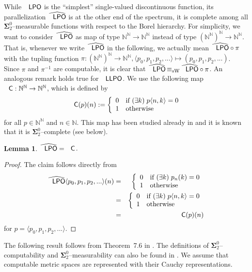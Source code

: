 \documentclass[jsl,10pt]{noasl}
\def\IN{{\mathbb{N}}}
\newcommand{\SO}[1]{{{\boldsymbol\Sigma}^0_{#1}}}
\def\LPO{\text{\rm\sffamily LPO}}
\def\LLPO{\text{\rm\sffamily LLPO}}
\def\C{\text{\rm\sffamily C}}
\def\LPO{\text{\rm\sffamily LPO}}
\def\LLPO{\text{\rm\sffamily LLPO}}
\def\equivSW{\mathop{\equiv_{\mathrm{sW}}}}
\newtheorem{lemma}[proposition]{Lemma}
\begin{document}
While $\LPO$ is the ``simplest'' single-valued discontinuous function, 
its parallelization $\widehat{\LPO}$ is at the other end of the spectrum,
it is complete among all $\SO{2}$--measurable functions with respect to the
Borel hierarchy. 
For simplicity, we want to consider $\widehat{\LPO}$ as map of type $\IN^\IN\to\IN^\IN$
instead of type $(\IN^\IN)^\IN\to\IN^\IN$. That is, whenever we write $\widehat{\LPO}$
in the following, we actually mean $\widehat{\LPO}\circ\pi$ with
the tupling function $\pi:(\IN^\IN)^\IN\to\IN^\IN,\langle p_0,p_1,p_2,...\rangle\mapsto(p_0,p_1,p_2,...)$.
Since $\pi$ and $\pi^{-1}$ are computable, it is clear that $\widehat{\LPO}\equivSW\widehat{\LPO}\circ\pi$.
An analogous remark holds true for $\LLPO$.
We use the following map $\C:\IN^\IN\to\IN^\IN$, which is defined by
\[\C(p)(n):=\left\{\begin{array}{ll}
  0 & \mbox{if $(\exists k)\;p\langle n,k\rangle=0$}\\
  1 & \mbox{otherwise}
\end{array}\right.
\]
for all $p\in\IN^\IN$ and $n\in\IN$. This map has been studied already in \cite{Ste89,Myl92,Bra99,Bra05}
and it is known that it is $\SO{2}$--complete (see below).

\begin{lemma}
\label{lem:LPO-C}
$\widehat{\LPO}=\C$.
\end{lemma}
\begin{proof}
The claim follows directly from
\begin{eqnarray*}
\widehat{\LPO}\langle p_0,p_1,p_2,...\rangle(n)
&=& \left\{\begin{array}{ll}
     0 & \mbox{if $(\exists k)\;p_n(k)=0$}\\
     1 & \mbox{otherwise}
    \end{array}\right.\\
&=& \left\{\begin{array}{ll}
    0 & \mbox{if $(\exists k)\;p\langle n,k\rangle=0$}\\
    1 & \mbox{otherwise}
    \end{array}\right.\\
&=& \C(p)(n)
\end{eqnarray*}
for $p=\langle p_0,p_1,p_2,...\rangle$.
\end{proof}

The following result follows from Theorem~7.6 in \cite{Bra05}. The definitions of $\SO{2}$--computability
and $\SO{2}$--measurability can also be found in \cite{Bra05}. We assume that computable metric spaces
are represented with their Cauchy representations.
\end{document}
